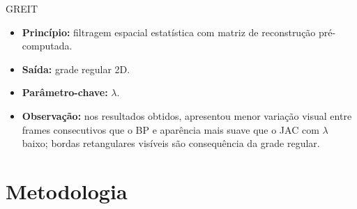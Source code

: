 \documentclass[aspectratio=169]{beamer}
\begin{document}
\begin{frame}{GREIT}
\begin{tcolorbox}[ufabcbox,title=GREIT]
\footnotesize
\begin{itemize}\setlength{\itemsep}{3pt}\setlength{\parskip}{0pt}\setlength{\topsep}{2pt}
  \item \textbf{Princípio:} filtragem espacial estatística com matriz de reconstrução pré-computada.
  \item \textbf{Saída:} grade regular 2D.
  \item \textbf{Parâmetro-chave:} $\lambda$.
  \item \textbf{Observação:} nos resultados obtidos, apresentou menor variação visual entre frames consecutivos que o BP e aparência mais suave que o JAC com $\lambda$ baixo; bordas retangulares visíveis são consequência da grade regular.
\end{itemize}
\end{tcolorbox}
\end{frame}

\section{Metodologia}
\end{document}
